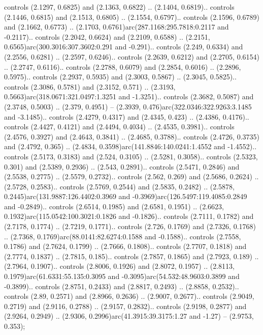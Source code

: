controls (2.1297, 0.6825) and (2.1363, 0.6822) .. (2.1404, 0.6819).. controls (2.1446, 0.6815) and (2.1513, 0.6805) .. (2.1554, 0.6797).. controls (2.1596, 0.6789) and (2.1662, 0.6773) .. (2.1703, 0.6761)arc(287.1168:295.7818:0.2117 and -0.2117).. controls (2.2042, 0.6624) and (2.2109, 0.6588) .. (2.2151, 0.6565)arc(300.3016:307.3602:0.291 and -0.291).. controls (2.249, 0.6334) and (2.2556, 0.6281) .. (2.2597, 0.6246).. controls (2.2639, 0.6212) and (2.2705, 0.6154) .. (2.2747, 0.6116).. controls (2.2788, 0.6079) and (2.2854, 0.6016) .. (2.2896, 0.5975).. controls (2.2937, 0.5935) and (2.3003, 0.5867) .. (2.3045, 0.5825).. controls (2.3086, 0.5781) and (2.3152, 0.571) .. (2.3193, 0.5663)arc(318.0671:321.0497:1.3251 and -1.3251).. controls (2.3682, 0.5087) and (2.3748, 0.5003) .. (2.379, 0.4951) -- (2.3939, 0.476)arc(322.0346:322.9263:3.1485 and -3.1485).. controls (2.4279, 0.4317) and (2.4345, 0.423) .. (2.4386, 0.4176).. controls (2.4427, 0.4121) and (2.4494, 0.4034) .. (2.4535, 0.3981).. controls (2.4576, 0.3927) and (2.4643, 0.3841) .. (2.4685, 0.3788).. controls (2.4726, 0.3735) and (2.4792, 0.365) .. (2.4834, 0.3598)arc(141.8846:140.0241:1.4552 and -1.4552).. controls (2.5173, 0.3183) and (2.524, 0.3105) .. (2.5281, 0.3058).. controls (2.5323, 0.301) and (2.5389, 0.2936) .. (2.543, 0.2891).. controls (2.5471, 0.2846) and (2.5538, 0.2775) .. (2.5579, 0.2732).. controls (2.562, 0.269) and (2.5686, 0.2624) .. (2.5728, 0.2583).. controls (2.5769, 0.2544) and (2.5835, 0.2482) .. (2.5878, 0.2445)arc(131.9887:126.4402:0.3969 and -0.3969)arc(126.5497:119.4085:0.2849 and -0.2849).. controls (2.6514, 0.1985) and (2.6581, 0.1951) .. (2.6623, 0.1932)arc(115.0542:100.3021:0.1826 and -0.1826).. controls (2.7111, 0.1782) and (2.7178, 0.1774) .. (2.7219, 0.1771).. controls (2.726, 0.1769) and (2.7326, 0.1768) .. (2.7368, 0.1769)arc(88.0141:82.6274:0.1588 and -0.1588).. controls (2.7558, 0.1786) and (2.7624, 0.1799) .. (2.7666, 0.1808).. controls (2.7707, 0.1818) and (2.7774, 0.1837) .. (2.7815, 0.185).. controls (2.7857, 0.1865) and (2.7923, 0.189) .. (2.7964, 0.1907).. controls (2.8006, 0.1926) and (2.8072, 0.1957) .. (2.8113, 0.1979)arc(61.6331:55.135:0.3095 and -0.3095)arc(54.532:48.9603:0.3899 and -0.3899).. controls (2.8751, 0.2433) and (2.8817, 0.2493) .. (2.8858, 0.2532).. controls (2.89, 0.2571) and (2.8966, 0.2636) .. (2.9007, 0.2677).. controls (2.9049, 0.2719) and (2.9116, 0.2788) .. (2.9157, 0.2832).. controls (2.9198, 0.2877) and (2.9264, 0.2949) .. (2.9306, 0.2996)arc(41.3915:39.3175:1.27 and -1.27) -- (2.9753, 0.353);




